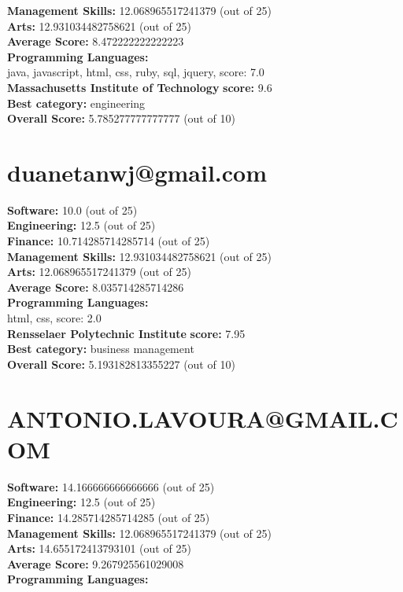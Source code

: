 \documentclass{article}
\begin{document}
\textbf{Management Skills:} 12.068965517241379 (out of 25)\\
\textbf{Arts:} 12.931034482758621 (out of 25)\\
\textbf{Average Score: } 8.472222222222223\\
\textbf{Programming Languages:} \\
java, javascript, html, css, ruby, sql, jquery, score: 7.0\\
\textbf{Massachusetts Institute of Technology} \textbf{score:} 9.6\\
\textbf{Best category: } engineering\\
\textbf{Overall Score: }5.785277777777777 (out of 10)\section{duanetanwj@gmail.com}
\textbf{Software:} 10.0 (out of 25)\\
\textbf{Engineering: } 12.5 (out of 25)\\
\textbf{Finance:} 10.714285714285714 (out of 25)\\
\textbf{Management Skills:} 12.931034482758621 (out of 25)\\
\textbf{Arts:} 12.068965517241379 (out of 25)\\
\textbf{Average Score: } 8.035714285714286\\
\textbf{Programming Languages:} \\
html, css, score: 2.0\\
\textbf{Rensselaer Polytechnic Institute} \textbf{score:} 7.95\\
\textbf{Best category: } business management\\
\textbf{Overall Score: }5.193182813355227 (out of 10)\section{ANTONIO.LAVOURA@GMAIL.COM}
\textbf{Software:} 14.166666666666666 (out of 25)\\
\textbf{Engineering: } 12.5 (out of 25)\\
\textbf{Finance:} 14.285714285714285 (out of 25)\\
\textbf{Management Skills:} 12.068965517241379 (out of 25)\\
\textbf{Arts:} 14.655172413793101 (out of 25)\\
\textbf{Average Score: } 9.267925561029008\\
\textbf{Programming Languages:} \\
\end{document}
